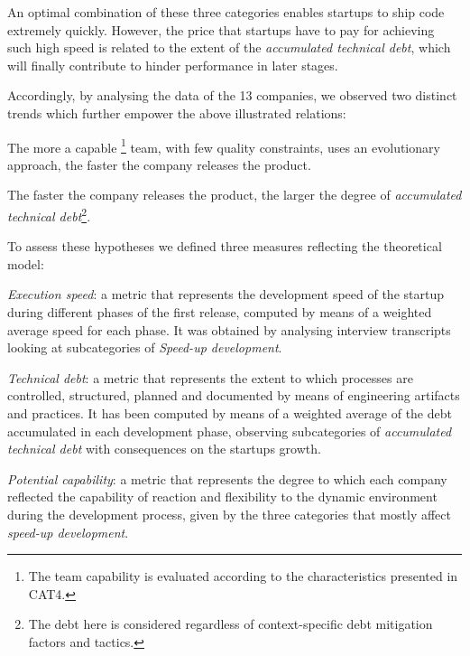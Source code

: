 \documentclass[10pt,journal,letterpaper,compsoc]{IEEEtran}
\begin{document}
An optimal combination of these three categories enables startups to ship code 
extremely quickly. However, the price that startups have to pay for achieving 
such high speed is related to the extent of the \textit{accumulated technical 
debt}, which will finally contribute to hinder performance in later stages.


Accordingly, by analysing the data of the 13 companies, we observed two 
distinct trends which further empower the above illustrated relations:

\begin{compactenum}
\item The more a capable \footnote{The team capability is evaluated according 
to the characteristics presented in CAT4.} team, with few quality constraints, 
uses an evolutionary approach, the faster the company releases the product.
\item The faster the company releases the product, the larger the degree of 
\textit{accumulated technical debt}\footnote{The debt here is considered 
regardless of context-specific debt mitigation factors and tactics.}.
\end{compactenum}

To assess these hypotheses we defined three measures reflecting the theoretical 
model:

\begin{compactitem}

\item \textit{Execution speed}: a metric that represents the development speed 
of the startup during different phases of the first release, computed by means 
of a weighted average speed for each phase. It was obtained by analysing 
interview transcripts looking at subcategories of \textit{Speed-up development}.

\item \textit{Technical debt}: a metric that represents the extent to which 
processes are controlled, structured, planned and documented by means of 
engineering artifacts and practices. It has been computed by means of a weighted 
average of the debt accumulated in each development phase, observing 
subcategories of  \textit{accumulated technical debt} with consequences on the 
startups growth.

\item \textit{Potential capability}: a metric that represents the degree to 
which each company reflected the capability of reaction and flexibility to the 
dynamic environment during the development process, given by the three 
categories that mostly affect \textit{speed-up development}.
\end{compactitem}
\end{document}

